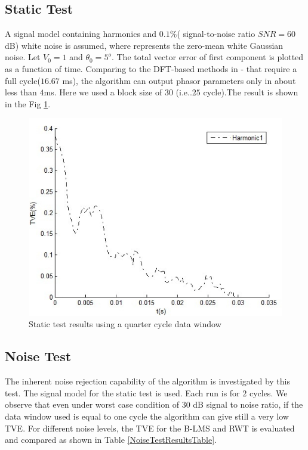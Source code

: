 \documentclass{UCF_ETD}
\begin{document}
\subsection{Static Test}
A signal model containing harmonics and $0.1\%$( signal-to-noise ratio $SNR = 60$ dB) white noise is assumed, where represents the zero-mean white Gaussian noise. Let $V_0=1$ and $\theta_0=5^o$. The total vector error of first component is plotted as a function of time. Comparing to the DFT-based methods in \cite{Benmouyal1989}- \cite{Sidhu1998} that require a full cycle($16.67$ ms), the algorithm can output phasor parameters only in about less than $4$ms. Here we used a block size of $30$ (i.e.$.25$ cycle).The result is shown in the Fig \ref{StaticTestResult}.

\begin{figure}[H] 
\begin{center}
\includegraphics[scale=0.67]{BLMS_Figures/StaticTestResult}
\caption{Static test results using a quarter cycle data window}
\label{StaticTestResult}
\end{center}
\end{figure}

\subsection{Noise Test}
The inherent noise rejection capability of the algorithm is investigated by this test. The signal model for the static test is used. Each run is for $2$ cycles. We observe that even under worst case condition of $30$ dB signal to noise ratio, if the data window used is equal to one cycle the algorithm can give still a very low TVE.  For different noise levels, the TVE for the B-LMS and RWT is evaluated and compared as shown in Table \ref{NoiseTestResultsTable}.
\end{document}
